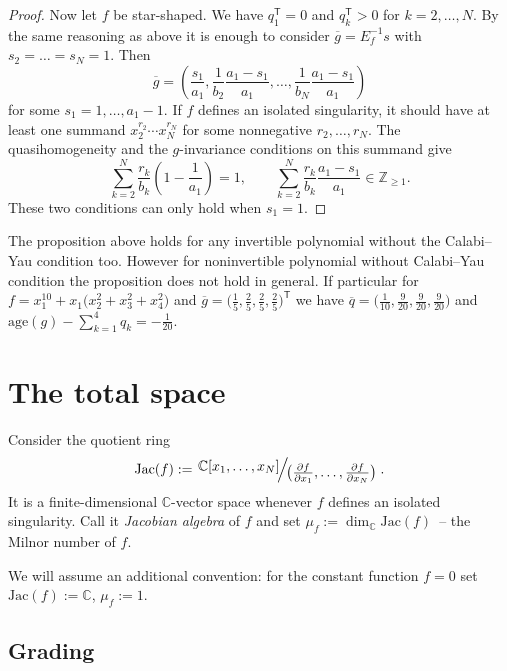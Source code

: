 \documentclass[10pt,a4paper]{amsart}
\numberwithin{equation}{section}
\newcommand{\CC}{{\mathbb{C}}}
\newcommand{\ZZ}{{\mathbb{Z}}}
\newcommand{\Jac}{\mathrm{Jac}}
\newcommand{\age}{\mathrm{age}}
\newcommand{\QR}[2]{
\left.\raisebox{0.5ex}{\ensuremath{#1}}
\ensuremath{\mkern-3mu}\Big/\ensuremath{\mkern-3mu}
\raisebox{-0.5ex}{\ensuremath{#2}}\right.}
\begin{document}
\begin{proof}
Now let $f$ be star-shaped. We have $q_1^{\mathsf{T}} = 0$ and $q_k^{\mathsf{T}} > 0$ for $k=2,\dots,N$. By the same reasoning as above it is enough to consider $\overline g = E_f^{-1}s$ with $s_2 = \dots = s_N = 1$. Then
\[
 \overline g = \left(\frac{s_1}{a_1}, \frac{1}{b_2}\frac{a_1-s_1}{a_1}, \dots, \frac{1}{b_{N}}\frac{a_1-s_1}{a_1} \right)
\]
for some $s_1 = 1,\dots,a_1-1$.
If $f$ defines an isolated singularity, it should have at least one summand $x_2^{r_2}\cdots x_N^{r_N}$ for some nonnegative $r_2,\dots,r_N$. The quasihomogeneity and the $g$-invariance conditions on this summand give
\[
 \sum_{k=2}^N \frac{r_k}{b_k}\left(1 - \frac{1}{a_1}\right) = 1, \qquad \sum_{k=2}^N \frac{r_k}{b_k}\frac{a_1-s_1}{a_1} \in \ZZ_{\ge 1}.
\]
These two conditions can only hold when $s_1=1$.
\end{proof}

\begin{Remark}
The proposition above holds for any invertible polynomial without the Calabi--Yau condition too. However for noninvertible polynomial without Calabi--Yau condition the proposition does not hold in general. If particular for ${f = x_1^{10} + x_1\bigl(x_2^2 + x_3^2 + x_4^2\bigr)}$ and $\overline g = \bigl(\frac{1}{5},\frac{2}{5},\frac{2}{5},\frac{2}{5}\bigr)^{\mathsf{T}}$ we have $\overline q = \bigl(\frac{1}{10},\frac{9}{20},\frac{9}{20},\frac{9}{20}\bigr)$ and $\age(g) - \sum_{k=1}^4 q_k = -\frac{1}{20}$.
\end{Remark}

\section{The total space}\label{section: total space}
Consider the quotient ring
\begin{equation*}
	\Jac(f) := \QR{\CC[x_1,\dots, x_N]}{\bigl(\frac{\partial f}{\partial x_1},\dots,\frac{\partial f}{\partial x_N}\bigr)}.
\end{equation*}
It is a finite-dimensional $\CC$-vector space whenever $f$ defines an isolated singularity.
Call it {\em Jacobian algebra} of $f$ and set $\mu_f:=\dim_\CC\Jac(f)$~-- the Milnor number of $f$.

We will assume an additional convention:
for the constant function $f = 0$ set $\Jac(f) := \CC$, $\mu_f := 1$.

\subsection{Grading}
\end{document}
